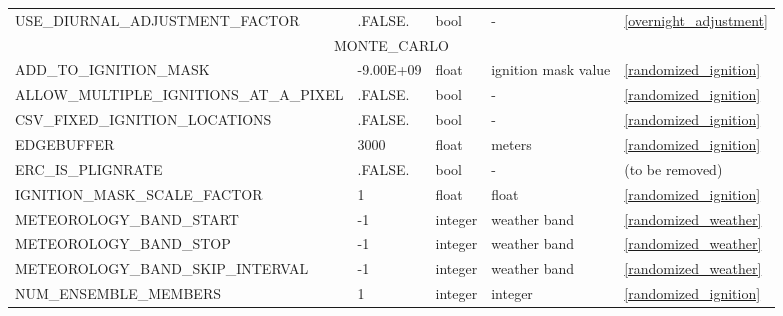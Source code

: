 \begin{landscape}
\begin{center}
\begin{longtable}{lllll}
USE\_DIURNAL\_ADJUSTMENT\_FACTOR             & .FALSE.                    & bool                   & -                                  & \ref{overnight_adjustment}           \\
\multicolumn{5}{c}{MONTE\_CARLO}                                                                                                                                               \\
\toprule
ADD\_TO\_IGNITION\_MASK                      & -9.00E+09                  & float                  & ignition mask value                & \ref{randomized_ignition}            \\
ALLOW\_MULTIPLE\_IGNITIONS\_AT\_A\_PIXEL     & .FALSE.                    & bool                   & -                                  & \ref{randomized_ignition}            \\
CSV\_FIXED\_IGNITION\_LOCATIONS              & .FALSE.                    & bool                   & -                                  & \ref{randomized_ignition}            \\
EDGEBUFFER                                   & 3000                       & float                  & meters                             & \ref{randomized_ignition}            \\
ERC\_IS\_PLIGNRATE                           & .FALSE.                    & bool                   & -                                  & (to be removed)                      \\
IGNITION\_MASK\_SCALE\_FACTOR                & 1                          & float                  & float                              & \ref{randomized_ignition}            \\
METEOROLOGY\_BAND\_START                     & -1                         & integer                & weather band                       & \ref{randomized_weather}             \\
METEOROLOGY\_BAND\_STOP                      & -1                         & integer                & weather band                       & \ref{randomized_weather}             \\
METEOROLOGY\_BAND\_SKIP\_INTERVAL            & -1                         & integer                & weather band                       & \ref{randomized_weather}             \\
NUM\_ENSEMBLE\_MEMBERS                       & 1                          & integer                & integer                            & \ref{randomized_ignition}            \\

\end{longtable}
\end{center}
\end{landscape}
